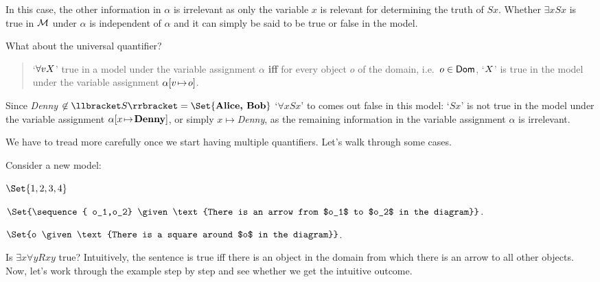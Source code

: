 In this case, the other information in $\alpha$ is irrelevant as only the variable $x$ is relevant for determining the truth of $Sx$. Whether $\exists x Sx$ is true in ${\mathcal{M}}$ under $\alpha$ is independent of $\alpha$ and it can simply be said to be true or false in the model. 

What about the universal quantifier?
\begin{quote}
	`$\forall vX$' true in a model under the variable assignment $\alpha$ \textbf{iff} for every object $o$ of the domain, i.e.~$o\in \mathsf{Dom}$, `$X$' is true in the model under the variable assignment $\alpha[v \!\mapsto\! o]$.
\end{quote}
Since \emph{Denny} $\not\in\denote{S}=\Set{\text{\emph{Alice, Bob}}}$ `$\forall x Sx$' to comes out false in this model: `$Sx$' is not true in the model under the variable assignment $\alpha[x \!\mapsto\! \textbf{Denny}]$, or simply $x\mapsto$\emph{Denny}, as the remaining information in the variable assignment $\alpha$ is irrelevant.


We have to tread more carefully once we start having multiple quantifiers. Let's walk through some cases.

Consider a new model: \begin{center}
	
	\begin{interp}
		\item[\domain] $\Set{1,2,3,4}$
		\item[\denote{R}] $\Set{\sequence{ o_1,o_2} \given \text{There is an arrow from $o_1$ to $o_2$ in the diagram}}$.
		\item[\denote{S}] $\Set{o \given \text{There is a square around $o$ in the diagram}}$.
	\end{interp}
\end{center}

Is $\exists x\forall y Rxy$ true? Intuitively, the sentence is true iff there is an object in the domain from which there is an arrow to all other objects. Now, let's work through the example step by step and see whether we get the intuitive outcome.


